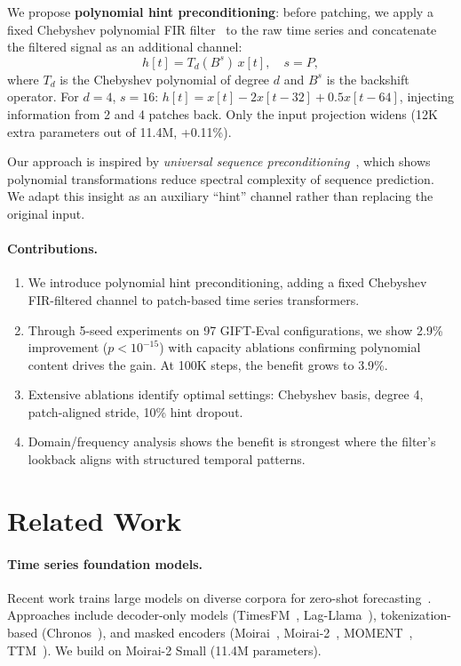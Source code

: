 \documentclass[letterpaper]{article}
\begin{document}
We propose \textbf{polynomial hint preconditioning}: before patching, we apply a fixed Chebyshev polynomial FIR filter~\citep{oppenheim1999discrete} to the raw time series and concatenate the filtered signal as an additional channel:
\begin{equation}
h[t] = T_d(B^s) \, x[t], \quad s = P,
\label{eq:hint}
\end{equation}
where $T_d$ is the Chebyshev polynomial of degree $d$ and $B^s$ is the backshift operator. For $d{=}4$, $s{=}16$:
$h[t] = x[t] {-} 2x[t{-}32] {+} 0.5x[t{-}64]$,
injecting information from 2 and 4 patches back. Only the input projection widens (12K extra parameters out of 11.4M, +0.11\%).

Our approach is inspired by \emph{universal sequence preconditioning}~\citep{marsden2024universal}, which shows polynomial transformations reduce spectral complexity of sequence prediction. We adapt this insight as an auxiliary ``hint'' channel rather than replacing the original input.

\paragraph{Contributions.}
\begin{enumerate}
    \item We introduce polynomial hint preconditioning, adding a fixed Chebyshev FIR-filtered channel to patch-based time series transformers.
    \item Through 5-seed experiments on 97 GIFT-Eval configurations, we show 2.9\% improvement ($p < 10^{-15}$) with capacity ablations confirming polynomial content drives the gain. At 100K steps, the benefit grows to 3.9\%.
    \item Extensive ablations identify optimal settings: Chebyshev basis, degree 4, patch-aligned stride, 10\% hint dropout.
    \item Domain/frequency analysis shows the benefit is strongest where the filter's lookback aligns with structured temporal patterns.
\end{enumerate}

\section{Related Work}

\paragraph{Time series foundation models.} Recent work trains large models on diverse corpora for zero-shot forecasting~\citep{liang2024foundation}. Approaches include decoder-only models (TimesFM~\citep{das2024decoder}, Lag-Llama~\citep{rasul2024lagllama}), tokenization-based (Chronos~\citep{ansari2024chronos}), and masked encoders (Moirai~\citep{woo2024unified}, Moirai-2~\citep{liu2024moirai2}, MOMENT~\citep{goswami2024moment}, TTM~\citep{ekambaram2024ttm}). We build on Moirai-2 Small (11.4M parameters).
\end{document}
